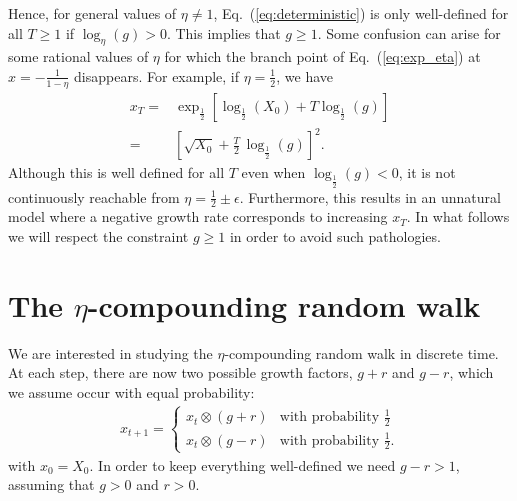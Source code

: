 \documentclass[11pt]{article}
\begin{document}
\begin{multicols}{2}
Hence, for general values of $\eta \neq 1$, Eq.~(\ref{eq:deterministic}) is only well-defined for all $T \geq 1$ if $\log_\eta(g) >0$. This implies that $g\geq 1$. 
Some confusion can arise for some rational values of $\eta$ for which the branch point of Eq.~(\ref{eq:exp_eta}) at $x = -\frac{1}{1-\eta}$ disappears. 
For example, if $\eta=\frac{1}{2}$, we have
\begin{align*}
x_T =& \exp_\frac{1}{2}\left[\log_\frac{1}{2}(X_0) + T \log_\frac{1}{2} (g)\right]\\
=& \left[ \sqrt{X_0} + \frac{T}{2}\,\log_\frac{1}{2} (g) \right]^2.
\end{align*}
Although this is well defined for all $T$ even when $\log_\frac{1}{2} (g) <0$, it is not continuously reachable from $\eta = \frac{1}{2} \pm \epsilon$.
Furthermore, this results in an unnatural model where a negative growth rate corresponds to increasing $x_T$. 
In what follows we will respect the constraint $g \geq 1$ in order to avoid such pathologies.


\section{The $\eta$-compounding random walk}
We are interested in studying the $\eta$-compounding random walk in discrete time. At each step, there are now two possible growth factors, $g+r$ and $g-r$, which  we assume occur with equal probability: 
\begin{align}
\label{eq-etaRandomWalk}
x_{t+1} = \left\{ 
\begin{array}{ll}
x_t \otimes \left(g +r \right) & \text{with probability $\frac{1}{2}$}\\
x_t \otimes \left(g - r \right)  & \text{with probability $\frac{1}{2}$}.
\end{array}
\right.
\end{align}
with $x_0 = X_0$.
In order to keep everything well-defined we need $g-r > 1$, assuming that $g>0$ and $r>0$.


\end{multicols}
\end{document}
